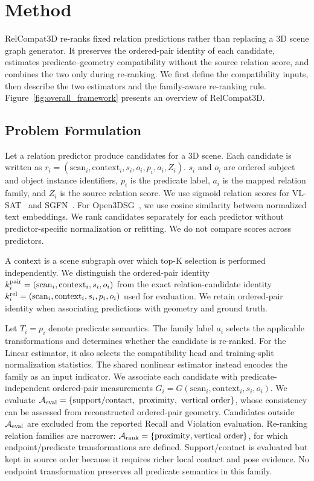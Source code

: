 \section{Method}
RelCompat3D re-ranks fixed relation predictions rather than replacing a 3D scene graph generator. It preserves the ordered-pair identity of each candidate, estimates predicate--geometry compatibility without the source relation score, and combines the two only during re-ranking. We first define the compatibility inputs, then describe the two estimators and the family-aware re-ranking rule. Figure~\ref{fig:overall_framework} presents an overview of RelCompat3D.

\subsection{Problem Formulation}
Let a relation predictor produce candidates for a 3D scene. Each candidate is written as $r_i=(\mathrm{scan}_i,\mathrm{context}_i,s_i,o_i,p_i,a_i,Z_i)$.
$s_i$ and $o_i$ are ordered subject and object instance identifiers, $p_i$ is the predicate label, $a_i$ is the mapped relation family, and $Z_i$ is the source relation score. We use sigmoid relation scores for VL-SAT~\cite{wang2023vl} and SGFN~\cite{wu2021scenegraphfusion}. For Open3DSG~\cite{koch2024open3dsg}, we use cosine similarity between normalized text embeddings. We rank candidates separately for each predictor without predictor-specific normalization or refitting. We do not compare scores across predictors.

A context is a scene subgraph over which top-K selection is performed independently. We distinguish the ordered-pair identity $k^{\rm pair}_i = (\mathrm{scan}_i, \mathrm{context}_i, s_i, o_i)$ from the exact relation-candidate identity $k^{\rm rel}_i = (\mathrm{scan}_i, \mathrm{context}_i, s_i, p_i, o_i)$ used for evaluation. We retain ordered-pair identity when associating predictions with geometry and ground truth.

Let $T_i=p_i$ denote predicate semantics. The family label $a_i$ selects the applicable transformations and determines whether the candidate is re-ranked. For the Linear estimator, it also selects the compatibility head and training-split normalization statistics. The shared nonlinear estimator instead encodes the family as an input indicator. We associate each candidate with predicate-independent ordered-pair measurements $G_i=G(\mathrm{scan}_i,\mathrm{context}_i,s_i,o_i)$. We evaluate $\mathcal{A}_{\rm eval}=\{\mathrm{support/contact},\ \mathrm{proximity},\ \mathrm{vertical\ order}\}$, whose consistency can be assessed from reconstructed ordered-pair geometry. Candidates outside $\mathcal{A}_{\rm eval}$ are excluded from the reported Recall and Violation evaluation. Re-ranking relation families are narrower: $\mathcal A_{\rm rank}=\{\mathrm{proximity},\mathrm{vertical\ order}\}$, for which endpoint/predicate transformations are defined. Support/contact is evaluated but kept in source order because it requires richer local contact and pose evidence. No endpoint transformation preserves all predicate semantics in this family.

